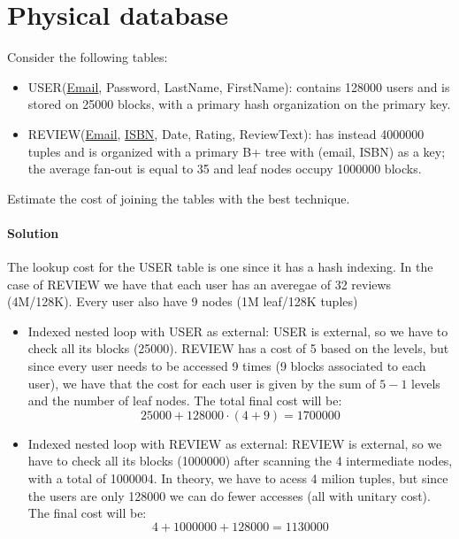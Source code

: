 \section{Physical database}

Consider the following tables: 
\begin{itemize}
    \item USER(\underline{Email}, Password, LastName, FirstName): contains 128000 users and is stored on 25000 blocks, with a primary hash organization on the primary key.
    \item REVIEW(\underline{Email}, \underline{ISBN}, Date, Rating, ReviewText): has instead 4000000 tuples and is organized with a primary B+ tree with (email, ISBN) as a key; the average fan-out is equal to 35 and leaf nodes occupy 1000000 blocks.
\end{itemize}
Estimate the cost of joining the tables with the best technique.

\paragraph*{Solution}
The lookup cost for the USER table is one since it has a hash indexing. 
In the case of REVIEW we have that each user has an averegae of 32 reviews (4M/128K). 
Every user also have 9 nodes (1M leaf/128K tuples)
\begin{itemize}
    \item Indexed nested loop with USER as external:
        USER is external, so we have to check all its blocks (25000).
        REVIEW has a cost of 5 based on the levels, but since every user needs to be accessed 9 times (9 blocks associated to each user), we have that the cost for each user is given by the sum of $5-1$ levels and the number of leaf nodes. 
        The total final cost will be: 
        \[25000 + 128000 \cdot (4 + 9) = 1700000\]
    \item Indexed nested loop with REVIEW as external:
        REVIEW is external, so we have to check all its blocks (1000000) after scanning the 4 intermediate nodes, with a total of 1000004.
        In theory, we have to acess 4 milion tuples, but since the users are only 128000 we can do fewer accesses (all with unitary cost).
        The final cost will be: 
        \[4 + 1000000 + 128000 = 1130000\]
\end{itemize}